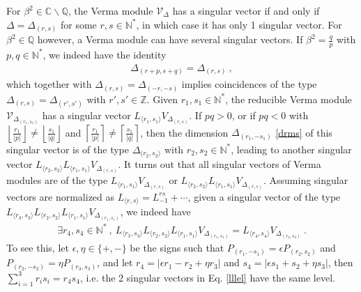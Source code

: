 \documentclass[12pt, a4paper]{article}
\begin{document}
For $\beta^2\in\mathbb{C}\backslash \mathbb{Q}$, the Verma module $\mathcal{V}_\Delta$ has a singular vector if and only if $\Delta=\Delta_{(r, s)}$ for some $r,s\in\mathbb{N}^*$, in which case it has only 1 singular vector. For $\beta^2\in\mathbb{Q}$ however, a Verma module can have several singular vectors. If $\beta^2 = \frac{q}{p}$ with $p,q\in\mathbb{N}^*$, we indeed have the identity
\begin{align}
 \Delta_{(r+p,s+q)} = \Delta_{(r,s)}\ ,
 \label{rpsq}
\end{align}
which together with $\Delta_{(r,s)}=\Delta_{(-r,-s)}$ implies coincidences of the type $\Delta_{(r,s)}=\Delta_{(r',s')}$ with $r',s'\in\mathbb{Z}$. 
Given $r_1,s_1\in \mathbb{N}^*$, the reducible Verma module $\mathcal{V}_{\Delta_{(r_1,s_1)}}$ has a singular vector $L_{\langle r_1,s_1\rangle} V_{\Delta_{(r,s)}}$. If $pq>0$, or if $pq<0$ with $\left\lfloor \frac{r_1}{|p|}\right\rfloor \neq \left\lfloor \frac{s_1}{|q|}\right\rfloor$ and $\left\lceil \frac{r_1}{|p|}\right\rceil \neq \left\lceil \frac{s_1}{|q|}\right\rceil$, then the dimension $\Delta_{(r_1,-s_1)}$ \eqref{drms} of this singular vector is of the type $\Delta_{(r_2,s_2\rangle}$ with $r_2,s_2\in\mathbb{N}^*$, leading to another singular vector $L_{\langle r_2,s_2\rangle}L_{\langle r_1,s_1\rangle} V_{\Delta_{(r,s)}}$.
It turns out that all singular vectors of Verma modules are of the type $L_{\langle r_1,s_1\rangle} V_{\Delta_{(r,s)}}$ or $L_{\langle r_2,s_2\rangle}L_{\langle r_1,s_1\rangle} V_{\Delta_{(r,s)}}$. Assuming singular vectors are normalized as $L_{\langle r,s\rangle} = L_{-1}^{rs} +\cdots$,
given a singular vector of the type $L_{\langle r_3,s_3\rangle}L_{\langle r_2,s_2\rangle}L_{\langle r_1,s_1\rangle} V_{\Delta_{(r_1,s_1)}}$, we indeed have
\begin{align}
 \exists r_4,s_4\in \mathbb{N}^*\ , \ L_{\langle r_3,s_3\rangle}L_{\langle r_2,s_2\rangle}L_{\langle r_1,s_1\rangle} V_{\Delta_{(r_1,s_1)}} = L_{\langle r_4,s_4\rangle} V_{\Delta_{(r_4,s_4)}}\ .
 \label{lllel}
\end{align}
To see this, let $\epsilon,\eta\in\{+,-\}$ be the signs such that $P_{(r_1,-s_1)}=\epsilon P_{(r_2,s_2)}$ and $P_{(r_2,-s_2)}=\eta P_{(r_3,s_3)}$, and let $r_4=|\epsilon r_1-r_2+\eta r_3|$ and $s_4=|\epsilon s_1+s_2+\eta s_3|$, then $\sum_{i=1}^3 r_is_i=r_4s_4$, i.e. the 2 singular vectors in Eq. \eqref{lllel} have the same level.
\end{document}
